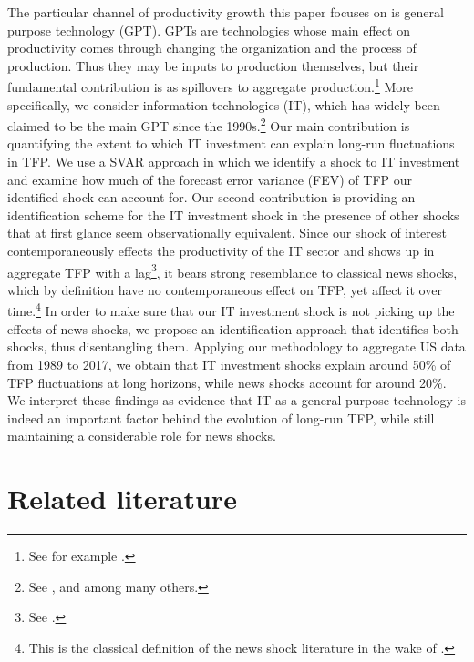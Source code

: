 \documentclass[11pt]{article}
\renewcommand{\[}{\begin{equation}}
\renewcommand{\]}{\end{equation}}
\begin{document}
The particular channel of productivity growth this paper focuses on is general purpose technology (GPT). GPTs are technologies whose main effect on productivity comes through changing the organization and the process of production. Thus they may be inputs to production themselves, but their fundamental contribution is as spillovers to aggregate production.\footnote{See for example \cite{bresnahan_trajtenberg1992}.} More specifically, we consider information technologies (IT), which has widely been claimed to be the main GPT since the 1990s.\footnote{See \cite{basu_etal2004}, \cite{brynjolfsson_etal1994} and \cite{allstar_paper} among many others.} Our main contribution is quantifying the extent to which IT investment can explain long-run fluctuations in TFP. We use a SVAR approach in which we identify a shock to IT investment and examine how much of the forecast error variance (FEV) of TFP our identified shock can account for. Our second contribution is providing an identification scheme for the IT investment shock in the presence of other shocks that at first glance seem observationally equivalent. Since our shock of interest contemporaneously effects the productivity of the IT sector and shows up in aggregate TFP with a lag\footnote{See \cite{david1989}.}, it bears strong resemblance to classical news shocks, which by definition have no contemporaneous effect on TFP, yet affect it over time.\footnote{This is the classical definition of the news shock literature in the wake of \cite{beaudry_portier2006}.} In order to make sure that our IT investment shock is not picking up the effects of news shocks, we propose an identification approach that identifies both shocks, thus disentangling them. 
Applying our methodology to aggregate US data from 1989 to 2017, we obtain that IT investment shocks explain around 50\% of TFP fluctuations at long horizons, while news shocks account for around 20\%. We interpret these findings as evidence that IT as a general purpose technology is indeed an important factor behind the evolution of long-run TFP, while still maintaining a considerable role for news shocks. 


\section{Related literature}
\label{sec_related_lit}
\end{document}
